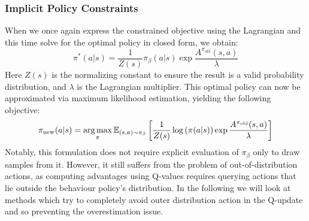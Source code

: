 \subsubsection{Implicit Policy Constraints}
When we once again express the constrained objective using the Lagrangian and this time solve for the optimal 
policy in closed form, we obtain:
$$\pi^*(a|s) = \frac{1}{Z(s)}\pi_\beta(a|s)\exp{\frac{A^{\pi_\text{old}}(s,a)}{\lambda}}$$ 
Here $Z(s)$ is the normalizing constant to ensure the result is a valid probability distribution, and $\lambda$ is the 
Lagrangian multiplier. This optimal policy can now be approximated via maximum likelihood estimation, yielding the 
following objective:
$$\pi_\text{new}(a|s)= \operatorname*{arg\,max}\limits_\pi \mathbb{E}_{(s,a)\sim \pi_\beta}\left[\frac{1}{Z(s)}\log{(\pi(a|s))}\exp{\frac{A^{\pi_\text{old}}(s,a)}{\lambda}}\right]$$
Notably, this formulation does not require explicit evaluation of $\pi_\beta$ only to draw samples from it.
However, it still suffers from the problem of out-of-distribution actions, as computing advantages using Q-values requires 
querying actions that lie outside the behaviour policy’s distribution. In the following 
we will look at methods which try to completely avoid outer distribution action in the Q-update and so
preventing the overestimation issue.

